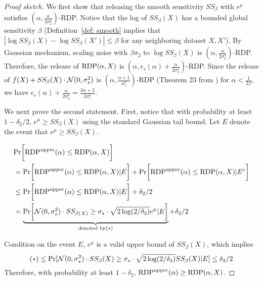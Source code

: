 \begin{proof}[Proof sketch]
  
We first show that releasing the smooth sensitivity $SS_\beta$ with $e^\mu$ satisfies $(\alpha, \frac{\alpha}{2\sigma_2^2})$-RDP. Notice that the log of $SS_\beta(X)$ has a bounded global sensitivity $\beta$ (Definition~\ref{def: smooth} implies that $|\log SS_\beta(X)-\log SS_\beta(X')|\leq \beta $ for any neighboring dataset $X, X'$). By Gaussian mechanism, scaling noise with $\beta \sigma_2$ to $\log SS_\beta(X)$ is $(\alpha, \frac{\alpha}{2\sigma_2^2})$-RDP.
Therefore, the release of $\mathrm{RDP}(\alpha, X)$ is $(\alpha, \epsilon_s(\alpha)+\frac{\alpha}{2\sigma_2^2})$-RDP. Since the release  of $ f(X) + SS_\beta(X)\cdot \mathcal{N}(0, \sigma_s^2)$ is $(\alpha, \frac{\alpha+1}{\sigma_s^2})$-RDP (Theorem 23 from \citet{papernot2018scalable}) for $\alpha<\frac{1}{2\beta}$, we have
$\epsilon_s(\alpha)+\frac{\alpha}{2\sigma_2^2}=\frac{3\alpha+2}{2\sigma_s^2}$.


We next prove the second statement. First, notice that with probability at least $1-\delta_2/2$, $e^\mu \geq SS_\beta(X)$ using the standard Gaussian tail bound.  Let $E$ denote the event that $e^{\mu}\geq SS_\beta(X)$. 




\begin{align*}
   & \mathrm{Pr}\bigg[\mathrm{RDP}^{\text{upper}}(\alpha)\leq \mathrm{RDP}(\alpha, X)\bigg] \\
   &=  \mathrm{Pr}\bigg[\mathrm{RDP}^{\text{upper}}(\alpha) \leq \mathrm{RDP}(\alpha,X)|E\bigg] + \mathrm{Pr}\bigg[\mathrm{RDP}^{\text{upper}}(\alpha)\leq \mathrm{RDP}(\alpha, X)|E^c\bigg]\\
   &\leq \mathrm{Pr}\bigg[\mathrm{RDP}^{\text{upper}}(\alpha) \leq\mathrm{RDP}(\alpha, X)|E\bigg] + \delta_2/2\\
   &= \underbrace{\mathrm{Pr}\bigg[\mathcal{N}(0, \sigma_s^2)\cdot SS_{\beta(X)}\geq \sigma_s \cdot \sqrt{2\log(2/\delta_2)}e^{\mu} |E\bigg]}_{\text{denoted by} (*)} + \delta_2/2\\
\end{align*}



Condition on the event $E$, $e^{\mu}$ is a valid upper bound of $SS_\beta(X)$, which implies  \[ (*) \leq  \mathrm{Pr}[\mathcal{N}(0, \sigma_s^2)\cdot SS_\beta(X) \geq \sigma_s \cdot \sqrt{2\log(2/\delta_2)} SS_\beta(X) |E] \leq \delta_2/2\]
Therefore, with probability at least $1- \delta_2$, $\mathrm{RDP}^{\text{upper}}(\alpha) \geq \mathrm{RDP}(\alpha, X)$.
\end{proof}



